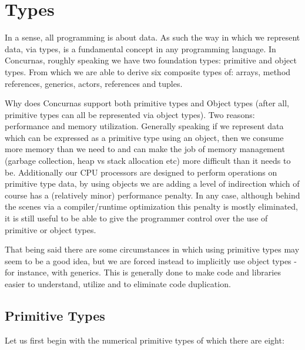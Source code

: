 \documentclass[conc-doc]{subfiles}
\begin{document}
\chapter[Types]{Types}


In a sense, all programming is about data. As such the way in which we represent data, via types, is a fundamental concept in any programming language. In Concurnas, roughly speaking we have two foundation types: primitive and object types. From which we are able to derive six composite types of: arrays, method references, generics, actors, references and tuples.

Why does Concurnas support both primitive types and Object types (after all, primitive types can all be represented via object types). Two reasons: performance and memory utilization. Generally speaking if we represent data which can be expressed as a primitive type using an object, then we consume more memory than we need to and can make the job of memory management (garbage collection, heap vs stack allocation etc) more difficult than it needs to be. Additionally our CPU processors are designed to perform operations on primitive type data, by using objects we are adding a level of indirection which of course has a (relatively minor) performance penalty. In any case, although behind the scenes via a compiler/runtime optimization this penalty is mostly eliminated, it is still useful to be able to give the programmer control over the use of primitive or object types.

That being said there are some circumstances in which using primitive types may seem to be a good idea, but we are forced instead to implicitly use object types - for instance, with generics. This is generally done to make code and libraries easier to understand, utilize and to eliminate code duplication.

\section{Primitive Types}
Let us first begin with the numerical primitive types of which there are eight: 
\end{document}
